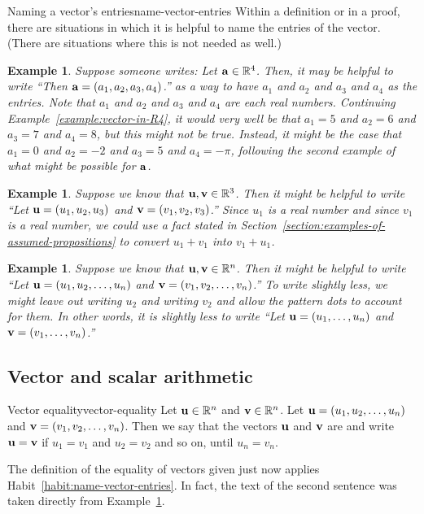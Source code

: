 \documentclass{book}
\newcounter{ekcounter}%
\theoremstyle{ekimcustom}
\newtheorem{example}[ekcounter]{Example}
\newcommand\defn[1]{{\color{blue}{\bf #1}}}
\begin{document}
\begin{bhabit}{Naming a vector's entries}{name-vector-entries}
Within a definition or in a proof, there are situations in which it is helpful to name the entries of the vector. (There are situations where this is not needed as well.)
\end{bhabit}
\begin{example}
Suppose someone writes: Let ${\bf a} \in \mathbb{R}^4$. Then, it may be helpful to write ``Then ${\bf a} = (a_1,a_2,a_3,a_4)$.'' as a way to have $a_1$ and $a_2$ and $a_3$ and $a_4$ as the entries. Note that $a_1$ and $a_2$ and $a_3$ and $a_4$ are each real numbers. Continuing Example~\ref{example:vector-in-R4}, it would very well be that $a_1=5$ and $a_2=6$ and $a_3=7$ and $a_4=8$, but this might not be true. Instead, it might be the case that $a_1=0$ and $a_2=-2$ and $a_3=5$ and $a_4=-\pi$, following the second example of what might be possible for ${\bf a}$.
\end{example}
\begin{example}
Suppose we know that ${\bf u}, {\bf v} \in \mathbb{R}^3$. Then it might be helpful to write ``Let ${\bf u} = (u_1,u_2,u_3)$ and ${\bf v}=(v_1,v_2,v_3)$.'' Since $u_1$ is a real number and since $v_1$ is a real number, we could use a fact stated in Section~\ref{section:examples-of-assumed-propositions} to convert $u_1+v_1$ into $v_1+u_1$.
\end{example}
\begin{example}\label{example:u-v-in-Rn}
Suppose we know that ${\bf u}, {\bf v} \in \mathbb{R}^n$. Then it might be helpful to write ``Let ${\bf u} = (u_1,u_2,\dots,u_n)$ and ${\bf v}=(v_1,v_2,\dots,v_n)$.'' To write slightly less, we might leave out writing $u_2$ and writing $v_2$ and allow the pattern dots to account for them. In other words, it is slightly less to write ``Let ${\bf u} = (u_1,\dots,u_n)$ and ${\bf v}=(v_1,\dots,v_n)$.'' 
\end{example}

\subsection{Vector and scalar arithmetic}

\begin{bdefinition}{Vector equality}{vector-equality}
Let ${\bf u} \in \mathbb{R}^n$ and ${\bf v} \in \mathbb{R}^n$. Let ${\bf u} = (u_1,u_2,\dots,u_n)$ and ${\bf v}=(v_1,v_2,\dots,v_n)$. Then we say that the vectors ${\bf u}$ and ${\bf v}$ are \defn{equal} and write ${\bf u} = {\bf v}$ if $u_1=v_1$ and $u_2=v_2$ and so on, until $u_n=v_n$.
\end{bdefinition}
The definition of the equality of vectors given just now applies Habit~\ref{habit:name-vector-entries}. In fact, the text of the second sentence was taken directly from Example~\ref{example:u-v-in-Rn}.
\end{document}
